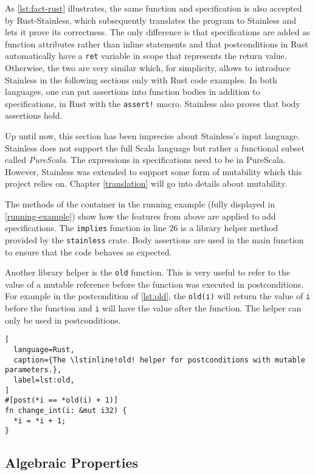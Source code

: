 As \autoref{lst:fact-rust} illustrates, the same function and specification is
also accepted by Rust-Stainless, which subsequently translates the program to
Stainless and lets it prove its correctness. The only difference is that
specifications are added as function attributes rather than inline statements
and that postconditions in Rust automatically have a \lstinline!ret! variable in
scope that represents the return value. Otherwise, the two are very similar
which, for simplicity, allows to introduce Stainless in the following sections
only with Rust code examples. In both languages, one can put assertions into
function bodies in addition to specifications, in Rust with the
\lstinline"assert!" macro. Stainless also proves that body assertions hold.

Up until now, this section has been imprecise about Stainless's input language.
Stainless does not support the full Scala language but rather a functional
subset called \emph{PureScala}. The expressions in specifications need to be in
PureScala. However, Stainless was extended to support some form of mutability
\cite{regb} which this project relies on. Chapter \ref{translation} will go into
details about mutability.

The methods of the container in the running example (fully displayed in
\autoref{running-example}) show how the features from above are applied to add
specifications. The \lstinline!implies! function in line 26 is a library helper
method provided by the \lstinline!stainless! crate. Body assertions are used in
the main function to ensure that the code behaves as expected.

Another library helper is the \lstinline!old! function. This is very useful to
refer to the value of a mutable reference before the function was executed in
postconditions. For example in the postcondition of \autoref{lst:old}, the
\lstinline!old(i)! will return the value of \lstinline!i! before the function
and \lstinline!i! will have the value after the function. The helper can only be
used in postconditions.

\begin{lstlisting}[
  language=Rust,
  caption={The \lstinline!old! helper for postconditions with mutable parameters.},
  label=lst:old,
]
#[post(*i == *old(i) + 1)]
fn change_int(i: &mut i32) {
  *i = *i + 1;
}
\end{lstlisting}

\subsection{Algebraic Properties}
\label{laws-intro}

